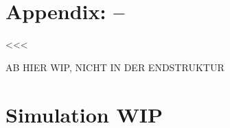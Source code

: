 \documentclass[parskip, twoside, accentcolor=tud9b, colorback, breaklinks, noresetcounter, noheadingspace, pdfencoding=unicode, 11pt, bigchapter, numbersubsubsec, numbers=noenddot, linedtoc, longdoc]{tudreport}
\begin{document}
	
\pagestyle{plain}
\appendix
\newcommand{\hiddensection}[1]{
    \stepcounter{section}
    \section*{\Alph{chapter}.\arabic{section}\hspace{0.8em}{#1}}
}
\chapter{Appendix: --}<<<
%    



\newpage
{\Huge AB HIER WIP, NICHT IN DER ENDSTRUKTUR}

\chapter{Simulation WIP}

\newpage
    
%     
%     
%     
% 
% 	
% 	
% 	
% 	
	
	
	
\cleardoublepage

% 
\printbibliography
%
\cleardoublepage

\listoffigures
\cleardoublepage

\listoftables
\cleardoublepage
\end{document}
